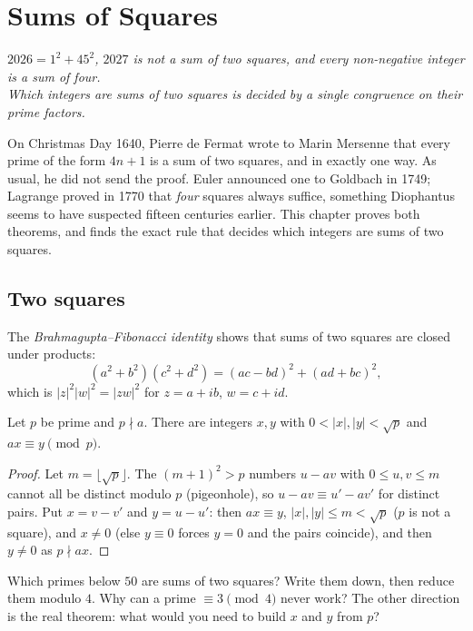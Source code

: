 \chapter{Sums of Squares}\label{ch:squares}

\begin{center}\itshape
$2026=1^2+45^2$, $2027$ is not a sum of two squares, and every non-negative integer is a sum of four.\\
Which integers are sums of two squares is decided by a single congruence on their prime factors.
\end{center}

On Christmas Day 1640, Pierre de Fermat wrote to Marin Mersenne that every prime of the form $4n+1$ is a sum of two squares, and in exactly one way.
As usual, he did not send the proof. Euler announced one to Goldbach in 1749; Lagrange proved in 1770 that \emph{four} squares always suffice,
something Diophantus seems to have suspected fifteen centuries earlier. This chapter proves both theorems, and finds the exact rule that decides which
integers are sums of two squares.


\section{Two squares}

The \emph{Brahmagupta--Fibonacci identity} shows that sums of two squares are closed under products:
\[
(a^2+b^2)(c^2+d^2)=(ac-bd)^2+(ad+bc)^2,
\]
which is $|z|^2|w|^2=|zw|^2$ for $z=a+ib$, $w=c+id$.

\begin{lemma}[Thue]\label{lem:thue}
Let $p$ be prime and $p\nmid a$. There are integers $x,y$ with $0<|x|,|y|<\sqrt p$ and $ax\equiv y\pmod p$.
\end{lemma}
\begin{proof}
Let $m=\lfloor\sqrt p\rfloor$. The $(m+1)^2>p$ numbers $u-av$ with $0\le u,v\le m$ cannot all be distinct modulo $p$ (pigeonhole), so $u-av\equiv u'-av'$ for distinct pairs. Put $x=v-v'$ and $y=u-u'$: then $ax\equiv y$, $|x|,|y|\le m<\sqrt p$ ($p$ is not a square), and $x\ne0$ (else $y\equiv0$ forces $y=0$ and the pairs coincide), and then $y\ne0$ as $p\nmid ax$.
\end{proof}

\begin{think}
Which primes below $50$ are sums of two squares? Write them down, then reduce them modulo $4$. Why can a prime $\equiv3\pmod4$ never work? The other direction is the real theorem: what would you need to build $x$ and $y$ from $p$?
\end{think}

